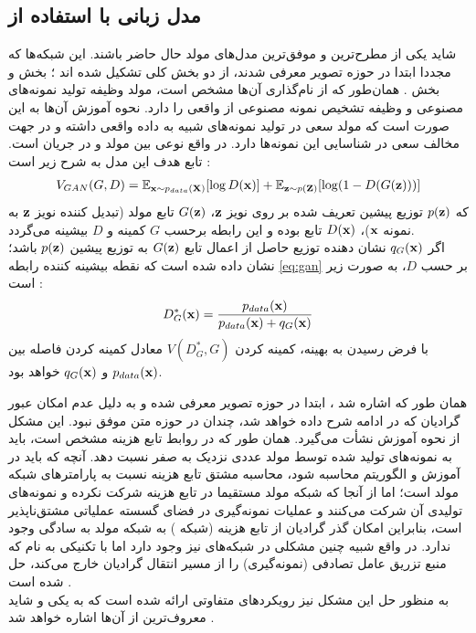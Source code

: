 \subsection{مدل زبانی با استفاده از \gan{}}
شاید \gan{} یکی از مطرح‌ترین و موفق‌ترین مدل‌های مولد حال حاضر باشند. این شبکه‌ها که مجددا ابتدا در حوزه تصویر معرفی شدند، از دو بخش کلی تشکیل شده اند \cite{gan}؛ بخش 
\generator{}
  و بخش 
\discriminator{}.
  همان‌طور که از نام‌گذاری آن‌ها مشخص است، مولد وظیفه تولید نمونه‌های مصنوعی و \discriminator{} وظیفه تشخیص نمونه مصنوعی از واقعی را دارد. نحوه آموزش آن‌ها به این صورت است که مولد سعی در تولید نمونه‌های شبیه به داده واقعی داشته و \discriminator{} در جهت مخالف سعی در شناسایی این نمونه‌ها دارد. در واقع نوعی 
بین مولد و \discriminator{} در جریان است. تابع هدف این مدل به شرح زیر است \cite{gan}:
\begin{equation} \label{eq:gan}
	\begin{split}
		V_{GAN} (G, D) = \expected_{\bff{x} \sim p_{data}(\bff{X})} [\log D(\bff{x})] + \expected_{\bff{z} \sim p(\bff{Z})} [\log (1 - D(G(\bff{z})))]
	\end{split}
\end{equation}
که  $p({\bf z})$ توزیع پیشین تعریف شده بر روی نویز ${\bf z}$،
$G({\bf z})$
تابع مولد (تبدیل کننده نویز ${\bf z}$ به نمونه ${\bf x}$)، $D({\bf x})$ تابع \discriminator{} بوده و این رابطه برحسب $G$ کمینه و $D$ بیشینه می‌گردد.\\
اگر $q_G({\bf x})$ نشان دهنده توزیع حاصل از اعمال تابع $G({\bf z})$ به توزیع پیشین $p({\bf z})$ باشد؛ نشان داده شده است که نقطه بیشینه کننده رابطه \ref{eq:gan} بر حسب $D$، به صورت زیر است \cite{gan}:
\begin{gather}
	D_G^*({\bf x}) = \frac{p_{data}({\bf x})}{p_{data}({\bf x}) + q_G({\bf x})}
\end{gather}
با فرض رسیدن به \discriminator{} بهینه، کمینه کردن $V(D^*_G,G)$ معادل کمینه کردن فاصله  بین $p_{data}({\bf x})$ و $q_G({\bf x})$ خواهد بود.

همان طور که اشاره شد \gan{}، ابتدا در حوزه تصویر معرفی شده و به دلیل عدم امکان عبور گرادیان که در ادامه شرح داده خواهد شد، چندان در حوزه متن موفق نبود. این مشکل از نحوه آموزش نشأت می‌گیرد. همان طور که در روابط تابع هزینه مشخص است، \discriminator{} باید به نمونه‌های تولید شده توسط مولد عددی نزدیک به صفر نسبت دهد. آنچه که باید در آموزش و الگوریتم 
محاسبه شود، محاسبه مشتق تابع هزینه نسبت به پارامتر‌های شبکه مولد است؛ اما از آنجا که شبکه مولد مستقیما در تابع هزینه شرکت نکرده و نمونه‌های تولیدی آن شرکت می‌کنند و عملیات نمونه‌گیری در فضای گسسته عملیاتی مشتق‌ناپذیر است، بنابراین امکان گذر گرادیان از تابع هزینه (شبکه \discriminator{}) به شبکه مولد به سادگی وجود ندارد. در واقع شبیه چنین مشکلی در شبکه‌های \vae{} نیز وجود دارد اما با تکنیکی به نام
که منبع تزریق عامل تصادفی (نمونه‌گیری) را از مسیر انتقال گرادیان خارج می‌کند، حل شده است \cite{vae}.\\
به منظور حل این مشکل نیز رویکرد‌های متفاوتی ارائه شده است که به یکی و شاید معروف‌ترین از آن‌ها اشاره خواهد شد \cite{seqgan, gumbel}.\\
